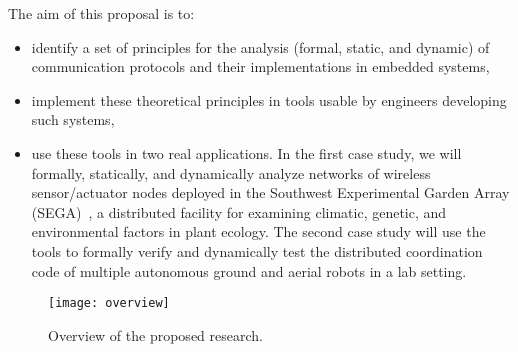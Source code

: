 The aim of this proposal is to:
\begin{itemize}
\item identify a set of principles for the analysis (formal, static,
  and dynamic) of communication protocols and
  their implementations in embedded systems,
\item implement these theoretical principles in tools usable by
  engineers developing such systems,
\item use these tools in two real applications.
  In the first case study, we will formally, statically, and dynamically analyze networks
  of wireless sensor/actuator nodes deployed in the Southwest Experimental Garden
  Array (SEGA)~\cite{YamEtAl10,FliEtAl12}, a distributed facility for
  examining climatic, genetic, and environmental factors in plant ecology.
  The second case study will use the tools to formally verify and dynamically test the distributed coordination code of multiple autonomous ground and aerial robots in a lab setting.
\end{itemize}


\begin{figure}[!t]
  \centering
  \texttt{[image: overview]}
  \caption{Overview of the proposed research.}
  \label{fig:overview}
\end{figure}

